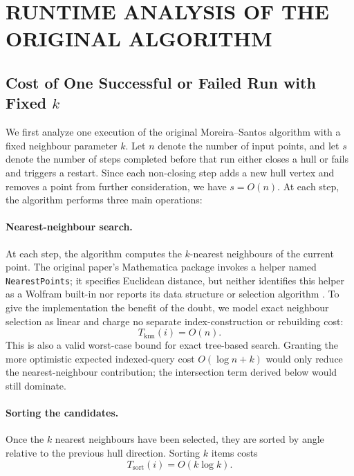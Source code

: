 \documentclass[a4paper,twoside]{article}
\begin{document}
\section{\uppercase{Runtime Analysis of the Original Algorithm}}
\subsection{Cost of One Successful or Failed Run with Fixed $k$}
We first analyze one execution of the original Moreira--Santos algorithm with a fixed neighbour parameter $k$. Let $n$ denote the number of input points, and let $s$ denote the number of steps completed before that run either closes a hull or fails and triggers a restart. Since each non-closing step adds a new hull vertex and removes a point from further consideration, we have $s = O(n)$.
At each step, the algorithm performs three main operations:
\paragraph{Nearest-neighbour search.}
At each step, the algorithm computes the $k$-nearest neighbours of the current point. The original paper's Mathematica package invokes a helper named \texttt{NearestPoints}; it specifies Euclidean distance, but neither identifies this helper as a Wolfram built-in nor reports its data structure or selection algorithm \cite{moreira2007}. To give the implementation the benefit of the doubt, we model exact neighbour selection as linear and charge no separate index-construction or rebuilding cost:
\[
T_{\mathrm{knn}}(i)=O(n).
\]
This is also a valid worst-case bound for exact tree-based search. Granting the more optimistic expected indexed-query cost $O(\log n+k)$ would only reduce the nearest-neighbour contribution; the intersection term derived below would still dominate.
\paragraph{Sorting the candidates.}
Once the $k$ nearest neighbours have been selected, they are sorted by angle relative to the previous hull direction. Sorting $k$ items costs
\[
T_{\mathrm{sort}}(i)=O(k\log k).
\]
\end{document}
